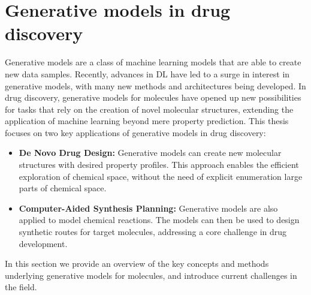 \section{Generative models in drug discovery}
Generative models are a class of machine learning models that are able to create new data samples.
Recently, advances in \ac{DL} have led to a surge in interest in generative models, with many new
methods and architectures being developed.  In drug discovery, generative models for molecules have
opened up new possibilities for tasks that rely on the creation of novel molecular structures,
extending the application of machine learning beyond mere property prediction. This thesis focuses
on two key applications of generative models in drug discovery:
\begin{itemize}
      \item \textbf{De Novo Drug Design:} Generative models can create new molecular structures with desired property
            profiles. This approach enables the efficient exploration of chemical space, without the need of
            explicit enumeration large parts of chemical space.
      \item \textbf{Computer-Aided Synthesis Planning:} Generative models are also applied to model
            chemical reactions. The models can then be used to design synthetic routes for target
            molecules, addressing a core challenge in drug development.
\end{itemize}

In this section we provide an overview of the key concepts and methods underlying generative models for molecules,
and introduce current challenges in the field.

